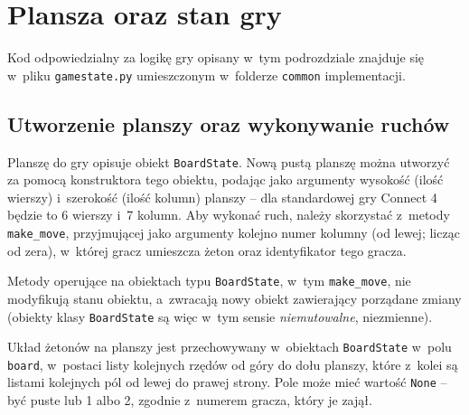 \documentclass[a4paper, 12pt, oneside]{report}
\begin{document}
\section{Plansza oraz stan gry}

Kod odpowiedzialny za logikę gry opisany w~tym podrozdziale znajduje się w~pliku \texttt{gamestate.py} umieszczonym w~folderze \texttt{common} implementacji.

\subsection{Utworzenie planszy oraz wykonywanie ruchów}

Planszę do gry opisuje obiekt \texttt{BoardState}. Nową pustą planszę można utworzyć za pomocą konstruktora tego obiektu, podając jako argumenty wysokość (ilość wierszy) i~szerokość (ilość kolumn) planszy -- dla standardowej gry Connect 4 będzie to 6 wierszy i~7 kolumn. Aby wykonać ruch, należy skorzystać z~metody \texttt{make\_move}, przyjmującej jako argumenty kolejno numer kolumny (od lewej; licząc od zera), w~której gracz umieszcza żeton oraz identyfikator tego gracza.

Metody operujące na obiektach typu \texttt{BoardState}, w~tym \texttt{make\_move}, nie modyfikują stanu obiektu, a~zwracają nowy obiekt zawierający porządane zmiany (obiekty klasy \texttt{BoardState} są więc w~tym sensie \emph{niemutowalne}, niezmienne).

Układ żetonów na planszy jest przechowywany w~obiektach \texttt{BoardState} w~polu \texttt{board}, w~postaci listy kolejnych rzędów od góry do dołu planszy, które z~kolei są listami kolejnych pól od lewej do prawej strony. Pole może mieć wartość \texttt{None} -- być puste lub 1 albo 2, zgodnie z~numerem gracza, który je zajął.

\needspace{5em}
\end{document}
